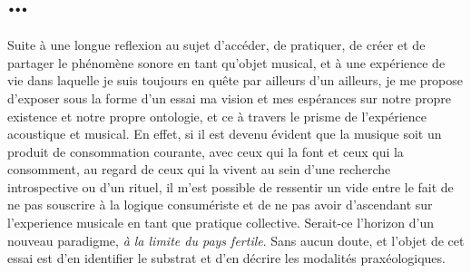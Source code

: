\documentclass{article}
\begin{document}
\section{…}
Suite à une longue reflexion au sujet d'accéder, de pratiquer, de créer et de partager le phénomène sonore en tant qu'objet musical, et à une expérience de vie dans laquelle je suis toujours en quête par ailleurs d'un ailleurs, 
 je me propose d'exposer sous la forme d'un essai ma vision et mes espérances sur notre propre existence et notre propre ontologie, et ce à travers le prisme de l'expérience acoustique et musical. En effet, si il est devenu évident que la musique soit un produit de consommation courante, avec ceux qui la font et ceux qui la consomment, au regard de ceux qui la vivent au sein d'une recherche introspective ou d'un rituel,
il m'est possible de ressentir un vide entre le fait de ne pas souscrire à la logique consumériste et de ne pas avoir d'ascendant sur l'experience musicale en tant que pratique collective.
Serait-ce l'horizon d'un nouveau paradigme, \textit{à la limite du pays fertile}. %
Sans aucun doute, et l'objet de cet essai est d'en identifier le substrat et d'en décrire les modalités praxéologiques\label{efn:pr}. 
\end{document}
